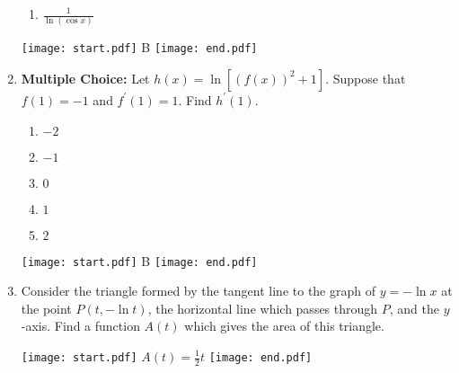 \documentclass[12pt]{article}
\begin{document}
\begin{enumerate}
\begin{enumerate}
\item $\frac{1}{\ln{(\cos{x})}}$

\end{enumerate}

\texttt{[image: start.pdf]}
{{B}}
\texttt{[image: end.pdf]}


\item {\bf Multiple Choice:} Let $h(x)=\ln[(f(x))^2+1]$.  Suppose that $f(1)=-1$ and $f^{\prime}(1)=1$.  Find $h^{\prime}(1)$.

\begin{enumerate}

\item $-2$

\item $-1$

\item $0$

\item $1$

\item $2$

\end{enumerate}

\texttt{[image: start.pdf]}
{{B}}
\texttt{[image: end.pdf]}


\item Consider the triangle formed by the tangent line to the graph of $y=-\ln{x}$ at the point $P(t,-\ln{t})$, the horizontal line which passes through $P$, and the $y$-axis. Find a function $A(t)$ which gives the area of this triangle.  

\texttt{[image: start.pdf]}
{{$A(t)=\frac{1}{2}t$}}
\texttt{[image: end.pdf]}


\end{enumerate}
\end{document}
